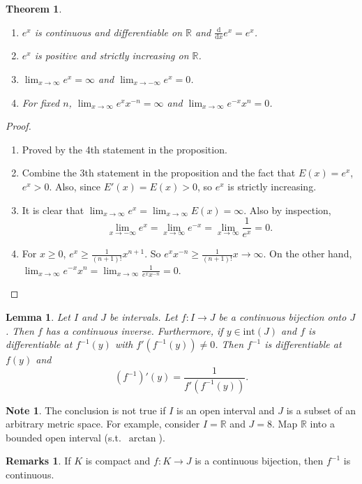 \documentclass[12pt]{article}
\theoremstyle{plain}
\newtheorem{thm}{Theorem}
\newtheorem*{lemma}{Lemma}
\theoremstyle{definition}
\newtheorem*{Remarks}{Remarks}
\newtheorem*{note}{Note}
\begin{document}
\begin{thm}
    \begin{enumerate}
        \item $e^x$ is continuous and differentiable on $\mathbb{R}$ and $\frac{\mathrm{d}}{\mathrm{d} x}e^x = e^x$.
        \item $e^x$ is positive and strictly increasing on $\mathbb{R}$.
        \item $\lim_{x\rightarrow\infty}e^x= \infty$ and $\lim_{x\rightarrow-\infty}e^x = 0$.
        \item For fixed $n$, $\lim_{x\rightarrow\infty}e^x x^{-n} = \infty$ and $\lim_{x\rightarrow \infty}e^{-x}x^n = 0$.
    \end{enumerate}
\end{thm}
\begin{proof}
    \begin{enumerate}
        \item Proved by the 4th statement in the proposition.
        \item Combine the 3th statement in the proposition and the fact that $E(x) =e^x$, $e^x>0$.
            Also, since $E'(x) = E(x)>0$, so $e^x$ is strictly increasing.
        \item It is clear that $\lim_{x\rightarrow\infty} e^x = \lim_{x\rightarrow\infty}E(x) =  \infty$.
            Also by inspection,
            \[\lim_{x\rightarrow-\infty} e^x = \lim_{x\rightarrow\infty}e^{-x} = \lim_{x\rightarrow\infty}\frac{1}{e^x} = 0.\]
        \item For $x\geq 0$, $e^x\geq \frac{1}{(n+1)!} x^{n+1}$.
            So $e^x x^{-n}\geq\frac{1}{(n+1)!}x\rightarrow\infty$.
            On the other hand, $\lim_{x\rightarrow\infty} e^{-x}x^n = \lim_{x\rightarrow\infty}\frac{1}{e^x x^{-n}}= 0 $.
    \end{enumerate}
\end{proof}

\begin{lemma}
    Let $I$ and $J$ be intervals.
    Let $f: I\rightarrow J$ be a continuous bijection onto $J$.
    Then $f$ has a continuous inverse.
    Furthermore, if $y\in\text{int}(J)$ and $f$ is differentiable at $f^{-1}(y)$ with $f'(f^{-1}(y))\neq 0$.
    Then $f^{-1}$ is differentiable at $f(y)$ and 
    \[(f^{-1})'(y) = \frac{1}{f'(f^{-1}(y))}.\]
\end{lemma}
\begin{note}
    The conclusion is not true if $I$ is an open interval and $J$ is a subset of an arbitrary metric space.
    For example, consider $I=\mathbb{R}$ and $J=8$.
    Map $\mathbb{R}$ into a bounded open interval (s.t.\ $\arctan$).
\end{note}
\begin{Remarks}
    If $K$ is compact and $f:K\rightarrow J$ is a continuous bijection, then $f^{-1}$ is continuous.
\end{Remarks}
\end{document}
